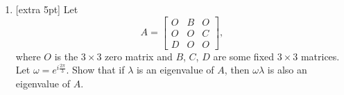 \documentclass{article}
\begin{document}
\begin{enumerate}
\item{} [extra 5pt] Let 
\[A = \begin{bmatrix}
 O & B & O \\
 O & O & C \\
 D & O & O 
\end{bmatrix},\]
where $O$ is the $3\times 3$ zero matrix and $B$, $C$, $D$ are some fixed $3\times 3$ matrices.  Let $\omega = e^{i\frac{2\pi}{3}}$.  Show that if $\lambda$ is an eigenvalue of $A$, then $\omega\lambda$ is also an eigenvalue of $A$.

\end{enumerate}
\end{document}
